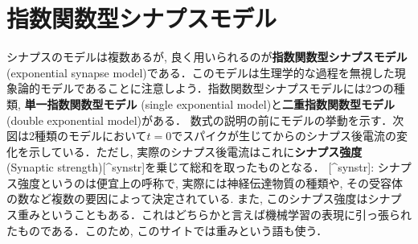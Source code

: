 \section{指数関数型シナプスモデル}シナプスのモデルは複数あるが, 良く用いられるのが\textbf{指数関数型シナプスモデル}(exponential synapse model)である．このモデルは生理学的な過程を無視した現象論的モデルであることに注意しよう．指数関数型シナプスモデルには2つの種類, \textbf{単一指数関数型モデル} (single exponential model)と\textbf{二重指数関数型モデル} (double exponential model)がある．
数式の説明の前にモデルの挙動を示す．次図は2種類のモデルにおいて$t=0$でスパイクが生じてからのシナプス後電流の変化を示している．ただし, 実際のシナプス後電流はこれに\textbf{シナプス強度} (Synaptic strength)[^synstr]を乗じて総和を取ったものとなる．
[^synstr]: シナプス強度というのは便宜上の呼称で, 実際には神経伝達物質の種類や, その受容体の数など複数の要因によって決定されている. また, このシナプス強度はシナプス重みということもある．これはどちらかと言えば機械学習の表現に引っ張られたものである．このため, このサイトでは重みという語も使う．